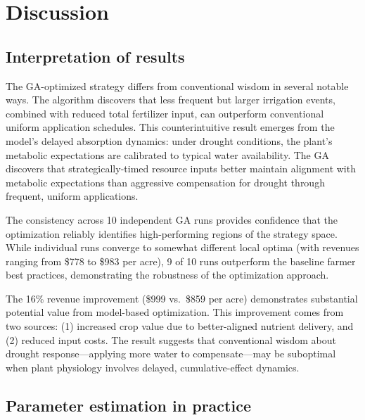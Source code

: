 \documentclass[preprint,12pt]{elsarticle}
\begin{document}
\section{Discussion}\label{sec:discussion}

\subsection{Interpretation of results}\label{subsec:interpretation}

The GA-optimized strategy differs from conventional wisdom in several notable ways. The algorithm discovers that less frequent but larger irrigation events, combined with reduced total fertilizer input, can outperform conventional uniform application schedules. This counterintuitive result emerges from the model's delayed absorption dynamics: under drought conditions, the plant's metabolic expectations are calibrated to typical water availability. The GA discovers that strategically-timed resource inputs better maintain alignment with metabolic expectations than aggressive compensation for drought through frequent, uniform applications.

The consistency across 10 independent GA runs provides confidence that the optimization reliably identifies high-performing regions of the strategy space. While individual runs converge to somewhat different local optima (with revenues ranging from \$778 to \$983 per acre), 9 of 10 runs outperform the baseline farmer best practices, demonstrating the robustness of the optimization approach.

The 16\% revenue improvement (\$999 vs.\ \$859 per acre) demonstrates substantial potential value from model-based optimization. This improvement comes from two sources: (1) increased crop value due to better-aligned nutrient delivery, and (2) reduced input costs. The result suggests that conventional wisdom about drought response---applying more water to compensate---may be suboptimal when plant physiology involves delayed, cumulative-effect dynamics.

\subsection{Parameter estimation in practice}\label{subsec:parameter-estimation}
\end{document}
